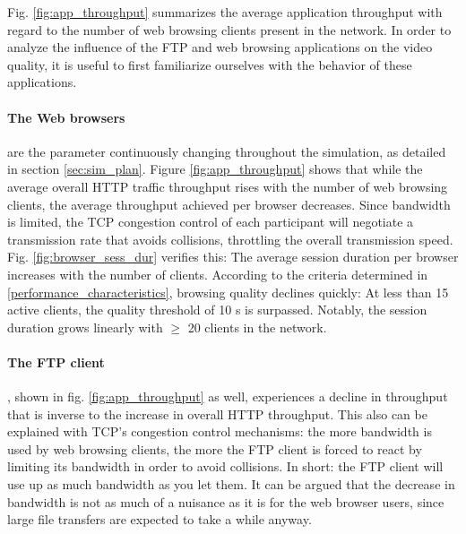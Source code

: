 \documentclass[
10pt, %
a4paper, %
oneside, %
headinclude,footinclude, %
BCOR5mm, %
]{scrartcl}
\begin{document}
Fig. \ref{fig:app_throughput} summarizes the average application throughput with regard to the number of web browsing clients present in the network. In order to analyze the influence of the FTP and web browsing applications on the video quality, it is useful to first familiarize ourselves with the behavior of these applications.

\paragraph{The Web browsers} are the parameter continuously changing throughout the simulation, as detailed in section \ref{sec:sim_plan}. Figure \ref{fig:app_throughput} shows that while the average overall HTTP traffic throughput rises with the number of web browsing clients, the average throughput achieved per browser decreases. Since bandwidth is limited, the TCP congestion control of each participant will negotiate a transmission rate that avoids collisions, throttling the overall transmission speed. Fig. \ref{fig:browser_sess_dur} verifies this: The average session duration per browser increases with the number of clients. According to the criteria determined in \ref{performance_characteristics}, browsing quality declines quickly: At less than 15 active clients, the quality threshold of 10 s is surpassed. Notably, the session duration grows linearly with $\geq$ 20 clients in the network.

\paragraph{The FTP client}, shown in fig. \ref{fig:app_throughput} as well, experiences a %
decline in throughput that is inverse to the increase in overall HTTP throughput. This also can be explained with TCP's congestion control mechanisms: the more bandwidth is used by web browsing clients, the more the FTP client is forced to react by limiting its bandwidth in order to avoid collisions. In short: the FTP client will use up as much bandwidth as you let them. It can be argued that the decrease in bandwidth is not as much of a nuisance as it is for the web browser users, since large file transfers are expected to take a while anyway.
\end{document}
